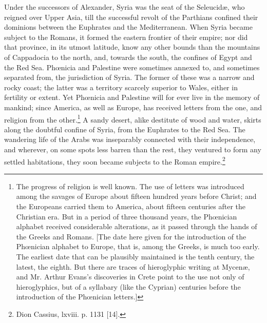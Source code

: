 Under the successors of Alexander, Syria was the seat of the Seleucidæ, who reigned over Upper Asia, till the successful revolt of the Parthians confined their dominions between the Euphrates and the Mediterranean. When Syria became subject to the Romans, it formed the eastern frontier of their empire; nor did that province, in its utmost latitude, know any other bounds than the mountains of Cappadocia to the north, and, towards the south, the confines of Egypt and the Red Sea. Phœnicia and Palestine were sometimes annexed to, and sometimes separated from, the jurisdiction of Syria. The former of these was a narrow and rocky coast; the latter was a territory scarcely superior to Wales, either in fertility or extent. Yet Phœnicia and Palestine will for ever live in the memory of mankind; since America, as well as Europe, has received letters from the one, and religion from the other.\footnote{The progress of religion is well known. The use of letters was introduced among the savages of Europe about fifteen hundred years before Christ; and the Europeans carried them to America, about fifteen centuries after the Christian era. But in a period of three thousand years, the Phœnician alphabet received considerable alterations, as it passed through the hands of the Greeks and Romans. [The date here given for the introduction of the Phœnician alphabet to Europe, that is, among the Greeks, is much too early. The earliest date that can be plausibly maintained is the tenth century, the latest, the eighth. But there are traces of hieroglyphic writing at Mycenæ, and Mr. Arthur Evans\texthebrew{}’s discoveries in Crete point to the use not only of hieroglyphics, but of a syllabary (like the Cyprian) centuries before the introduction of the Phœnician letters.]} A sandy desert, alike destitute of wood and water, skirts along the doubtful confine of Syria, from the Euphrates to the Red Sea. The wandering life of the Arabs was inseparably connected with their independence, and wherever, on some spots less barren than the rest, they ventured to form any settled habitations, they soon became subjects to the Roman empire.\footnote{Dion Cassius, lxviii. p. 1131 [14].}

